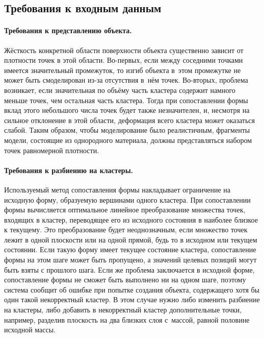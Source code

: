 \documentclass[a4paper, 14pt, titlepage]{extarticle}
\begin{document}
    \subsection{Требования к входным данным}\label{ssec:requirements}

      \paragraph{Требования к представлению объекта.}
      Жёсткость конкретной области поверхности объекта существенно зависит от плотности точек в этой
      области. Во-первых, если между соседними точками имеется значительный промежуток, то изгиб
      объекта в~этом промежутке не может быть смоделирован из-за отсутствия в~нём точек. Во-вторых,
      проблема возникает, если значительная по объёму часть кластера содержит намного меньше точек,
      чем остальная часть кластера. Тогда при сопоставлении формы вклад этого небольшого числа точек будет
      также незначителен, и, несмотря на сильное отклонение в этой области, деформация всего
      кластера может оказаться слабой. Таким образом, чтобы моделирование было реалистичным,
      фрагменты модели, состоящие из однородного материала, должны представляться набором точек
      равномерной плотности.

      \paragraph{Требования к разбиению на кластеры.}
      Используемый метод сопоставления формы накладывает ограничение на исходную форму, образуемую
      вершинами одного кластера. При сопоставлении формы вычисляется оптимальное линейное преобразование
      множества точек, входящих в кластер, переводящее его из исходного состояния в наиболее близкое
      к текущему. Это преобразование будет неоднозначным, если множество точек лежит в одной
      плоскости или на одной прямой, будь то в исходном или текущем состоянии. Если такую форму
      имеет текущее состояние кластера, сопоставление формы на этом шаге может быть пропущено, а значений
      целевых позиций могут быть взяты с прошлого шага. Если же проблема заключается в
      исходной форме, сопоставление формы не сможет быть выполнено ни на одном шаге, поэтому система сообщит
      об ошибке при попытке создания объекта, содержащего хотя бы один такой некорректный кластер.
      В этом случае нужно либо изменить разбиение на кластеры, либо добавить в некорректный кластер
      дополнительные точки, например, разделив плоскость на два близких слоя с~массой, равной
      половине исходной массы.
\end{document}
